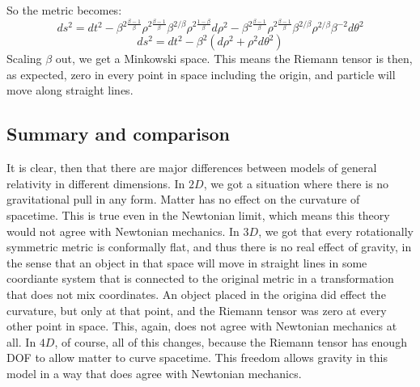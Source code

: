 \documentclass{article}
\begin{document}
So the metric becomes:
\begin{equation}
    ds^2 = dt^2 - \beta^{2\frac{\beta-1}{\beta}}\rho^{2\frac{\beta-1}{\beta}}\beta^{2/\beta}\rho^{2\frac{1 - \beta}{\beta}}d\rho^2 - \beta^{2\frac{\beta-1}{\beta}}\rho^{2\frac{\beta-1}{\beta}}\beta^{2/\beta}\rho^{2/\beta}\beta^{-2}d\theta^2
\end{equation}
\begin{equation}
    ds^2 = dt^2 - \beta^2(d\rho^2 + \rho^2d\theta^2)
\end{equation}
Scaling $\beta$ out, we get a Minkowski space. This means the Riemann tensor is then, as expected, zero in every point in space including the origin, and particle will move along straight lines.
\subsection{Summary and comparison}
It is clear, then that there are major differences between models of general relativity in different dimensions.
\newline
In $2D$, we got a situation where there is no gravitational pull in any form. Matter has no effect on the curvature of spacetime. This is true even in the Newtonian limit, which means this theory would not agree with Newtonian mechanics.
\newline
In $3D$, we got that every rotationally symmetric metric is conformally flat, and thus there is no real effect of gravity, in the sense that an object in that space will move in straight lines in some coordiante system that is connected to the original metric in a transformation that does not mix coordinates. An object placed in the origina did effect the curvature, but only at that point, and the Riemann tensor was zero at every other point in space. This, again, does not agree with Newtonian mechanics at all.
\newline
In $4D$, of course, all of this changes, because the Riemann tensor has enough DOF to allow matter to curve spacetime. This freedom allows gravity in this model in a way that does agree with Newtonian mechanics.
\end{document}
